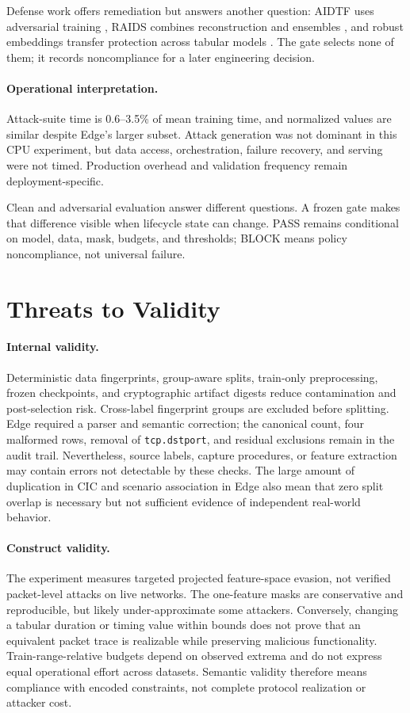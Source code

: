 \documentclass[runningheads]{llncs}
\begin{document}
Defense work offers remediation but answers another question: AIDTF uses adversarial training \cite{xiong2023aidtf}, RAIDS combines reconstruction and ensembles \cite{sarikaya2023raids}, and robust embeddings transfer protection across tabular models \cite{kireev2023embeddings}. The gate selects none of them; it records noncompliance for a later engineering decision.

\paragraph{Operational interpretation.}
Attack-suite time is 0.6--3.5\% of mean training time, and normalized values are similar despite Edge's larger subset. Attack generation was not dominant in this CPU experiment, but data access, orchestration, failure recovery, and serving were not timed. Production overhead and validation frequency remain deployment-specific.

Clean and adversarial evaluation answer different questions. A frozen gate makes that difference visible when lifecycle state can change. PASS remains conditional on model, data, mask, budgets, and thresholds; BLOCK means policy noncompliance, not universal failure.

\section{Threats to Validity}
\paragraph{Internal validity.} Deterministic data fingerprints, group-aware splits, train-only preprocessing, frozen checkpoints, and cryptographic artifact digests reduce contamination and post-selection risk. Cross-label fingerprint groups are excluded before splitting. Edge required a parser and semantic correction; the canonical count, four malformed rows, removal of \texttt{tcp.dstport}, and residual exclusions remain in the audit trail. Nevertheless, source labels, capture procedures, or feature extraction may contain errors not detectable by these checks. The large amount of duplication in CIC and scenario association in Edge also mean that zero split overlap is necessary but not sufficient evidence of independent real-world behavior.

\paragraph{Construct validity.} The experiment measures targeted projected feature-space evasion, not verified packet-level attacks on live networks. The one-feature masks are conservative and reproducible, but likely under-approximate some attackers. Conversely, changing a tabular duration or timing value within bounds does not prove that an equivalent packet trace is realizable while preserving malicious functionality. Train-range-relative budgets depend on observed extrema and do not express equal operational effort across datasets. Semantic validity therefore means compliance with encoded constraints, not complete protocol realization or attacker cost.
\end{document}
